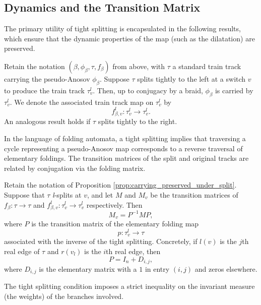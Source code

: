\subsection{Dynamics and the Transition Matrix}

The primary utility of tight splitting is encapsulated in the following results, which ensure that the dynamic properties of the map (such as the dilatation) are preserved.

\begin{prop}
\label{prop:carrying_preserved_under_split}
    Retain the notation $(\beta, \phi_\beta, \tau, f_\beta)$ from above, with $\tau$ a standard train track carrying the pseudo-Anosov $\phi_\beta$. Suppose $\tau$ splits tightly to the left at a switch $v$ to produce the train track $\tau_v^l$. Then, up to conjugacy by a braid, $\phi_\beta$ is carried by $\tau_v^l$. We denote the associated train track map on $\tau_v^l$ by
    \[
    f_{\beta, v}^{l} \colon \tau_{v}^{l} \to \tau_{v}^{l}.
    \]
    An analogous result holds if $\tau$ splits tightly to the right.
\end{prop}

In the language of folding automata, a tight splitting implies that traversing a cycle representing a pseudo-Anosov map corresponds to a reverse traversal of elementary foldings. The transition matrices of the split and original tracks are related by conjugation via the folding matrix.

\begin{prop}
\label{prop:transition_matrix_split}
Retain the notation of Proposition \ref{prop:carrying_preserved_under_split}. Suppose that $\tau$ \textit{l}-splits at $v$, and let $M$ and $M_{v}$ be the transition matrices of $f_\beta \colon \tau \to \tau$ and $f_{\beta, v}^{l} \colon \tau_{v}^{l} \to \tau_{v}^{l}$ respectively. Then
\[
M_v = P^{-1}MP,
\]
where $P$ is the transition matrix of the elementary folding map
\[
p \colon \tau_{v}^{l} \to \tau
\]
associated with the inverse of the tight splitting. Concretely, if $l(v)$ is the $j$th real edge of $\tau$ and $r(v_l)$ is the $i$th real edge, then
\[
P = I_n + D_{i,j},
\]
where $D_{i,j}$ is the elementary matrix with a $1$ in entry $(i,j)$ and zeros elsewhere.
\end{prop}

The tight splitting condition imposes a strict inequality on the invariant measure (the weights) of the branches involved.


